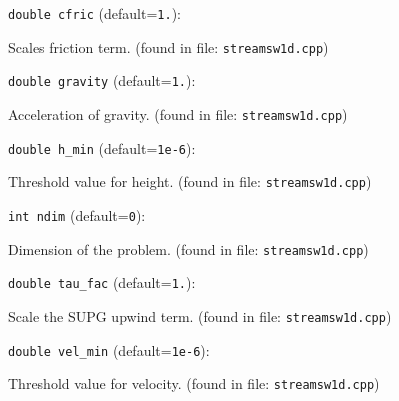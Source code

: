 \item\verb+double cfric+ {\rm(default=\verb|1.|)}:

Scales friction term.
 (found in file: \verb+streamsw1d.cpp+)
\item\verb+double gravity+ {\rm(default=\verb|1.|)}:

Acceleration of gravity.
 (found in file: \verb+streamsw1d.cpp+)
\item\verb+double h_min+ {\rm(default=\verb|1e-6|)}:

Threshold value for height.
 (found in file: \verb+streamsw1d.cpp+)
\item\verb+int ndim+ {\rm(default=\verb|0|)}:

Dimension of the problem. 
 (found in file: \verb+streamsw1d.cpp+)
\item\verb+double tau_fac+ {\rm(default=\verb|1.|)}:

Scale the SUPG upwind term. 
 (found in file: \verb+streamsw1d.cpp+)
\item\verb+double vel_min+ {\rm(default=\verb|1e-6|)}:

Threshold value for velocity.
 (found in file: \verb+streamsw1d.cpp+)
